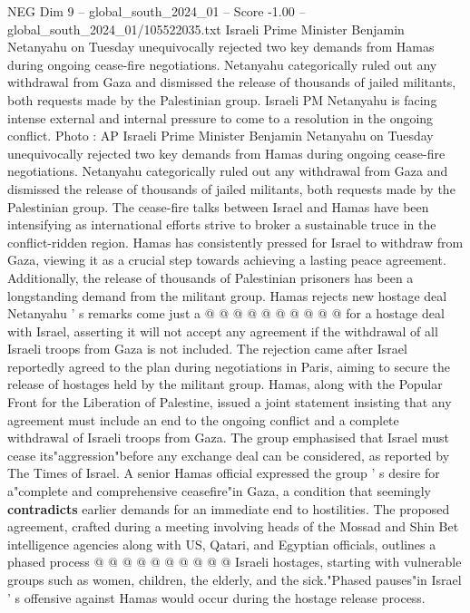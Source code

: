 \begin{textsample}{NEG Dim 9 – global\_south\_2024\_01 – Score -1.00 – global\_south\_2024\_01/105522035.txt}  \label{ex:f9_neg_390}
Israeli Prime Minister Benjamin Netanyahu on Tuesday unequivocally rejected two key demands from Hamas during ongoing cease-fire negotiations.
Netanyahu categorically ruled out any withdrawal from Gaza and dismissed the release of thousands of jailed militants, both requests made by the Palestinian group.
Israeli PM Netanyahu is facing intense external and internal pressure to come to a resolution in the ongoing conflict.
Photo : AP Israeli Prime Minister Benjamin Netanyahu on Tuesday unequivocally rejected two key demands from Hamas during ongoing cease-fire negotiations.
Netanyahu categorically ruled out any withdrawal from Gaza and dismissed the release of thousands of jailed militants, both requests made by the Palestinian group.
The cease-fire talks between Israel and Hamas have been intensifying as international efforts strive to broker a sustainable truce in the conflict-ridden region.
Hamas has consistently pressed for Israel to withdraw from Gaza, viewing it as a crucial step towards achieving a lasting peace agreement.
Additionally, the release of thousands of Palestinian prisoners has been a longstanding demand from the militant group.
Hamas rejects new hostage deal Netanyahu ' s remarks come just a @ @ @ @ @ @ @ @ @ @ for a hostage deal with Israel, asserting it will not accept any agreement if the withdrawal of all Israeli troops from Gaza is not included.
The rejection came after Israel reportedly agreed to the plan during negotiations in Paris, aiming to secure the release of hostages held by the militant group.
Hamas, along with the Popular Front for the Liberation of Palestine, issued a joint statement insisting that any agreement must include an end to the ongoing conflict and a complete withdrawal of Israeli troops from Gaza.
The group emphasised that Israel must cease its"aggression"before any exchange deal can be considered, as reported by The Times of Israel.
A senior Hamas official expressed the group ' s desire for a"complete and comprehensive ceasefire"in Gaza, a condition that seemingly \textbf{contradicts} earlier demands for an immediate end to hostilities.
The proposed agreement, crafted during a meeting involving heads of the Mossad and Shin Bet intelligence agencies along with US, Qatari, and Egyptian officials, outlines a phased process @ @ @ @ @ @ @ @ @ @ Israeli hostages, starting with vulnerable groups such as women, children, the elderly, and the sick."Phased pauses"in Israel ' s offensive against Hamas would occur during the hostage release process.

\end{textsample}
